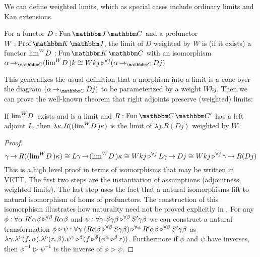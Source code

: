 \documentclass{llncs}
\begin{document}
We can define weighted limits, which as special cases include ordinary
limits and Kan extensions.
\begin{definition}
  For a functor $D : \varr {\cat J}{\cat C}$ and a profunctor $W :
  \harr{\cat K}{\cat J}$, the limit of $D$ weighted by $W$ is (if it
  exists) a functor $\weightedLimitDW D W : \varr{\cat K}{\cat C}$
  with an isomorphism $\punitinXfromYtoZ {\cat C} {\alpha} {(\weightedLimitDW D W) k} \cong \homrallXYtoZ j {W k j} {(\punitinXfromYtoZ {\cat C} \alpha {D j})}$
\end{definition}
This generalizes the usual definition that a morphism into a limit is
a cone over the diagram $(\punitinXfromYtoZ {\cat C} \alpha {D j})$ to
be parameterized by a weight $W k j$.
Then we can prove the well-known theorem that right adjoints preserve (weighted) limits:
\begin{theorem}
  If $\weightedLimitDW D W$ exists and is a limit and $R : \varr{\cat
    C}{\cat C'}$ has a left adjoint $L$, then $\lambda
  \kappa. R((\weightedLimitDW D W) \kappa)$ is the limit of $\lambda
  j. R(D j)$ weighted by $W$.
\end{theorem}
\begin{proof}
\[
    \punitinXfromYtoZ {} {\gamma} {R ((\weightedLimitDW D W) \kappa)}
    \cong \punitinXfromYtoZ {}{L \gamma} {(\weightedLimitDW D W) \kappa}
    \cong \homrallXYtoZ {j}{W k j} {\punitinXfromYtoZ {}{L \gamma}{D j}}
    \cong \homrallXYtoZ {j}{W k j} {\punitinXfromYtoZ {}{\gamma}{R(D j)}}\\
\]
This is a high level proof in terms of isomorphisms that may be written
in VETT. The first two steps are the instantiation of assumptions
(adjointness, weighted limits). The last step uses the fact that a
natural isomorphisms lift to natural isomorphism of homs of profunctors.
The construction of this isomorphism illustrates how naturality need not
be proved explicitly in \vett{}.  For any $\phi: \homunary \alpha {R'
  \alpha \beta} \beta {R \alpha \beta}$ and $\psi : \homunary \gamma {S
  \gamma \beta} \beta {S' \gamma \beta}$ we can construct a natural
transformation $\phi \triangleright \psi : \hombinary \gamma
{(\homrallXYtoZ \beta {R \alpha \beta}{S \gamma \beta})} {\alpha}
{R'\alpha\beta} \beta {S'\gamma\beta}$ as \\ $\lambdabinary {\gamma} {f}
{\alpha} r \beta {\appunary \psi \gamma {(\homrappXtoYatZ f {(\appunary
      \phi \alpha r \beta)} \beta)} \beta}$. Furthermore if $\phi$ and
$\psi$ have inverses, then $\phi^{-1} \triangleright \psi^{-1}$ is the
inverse of $\phi \triangleright \psi$.
\end{proof}
\end{document}
